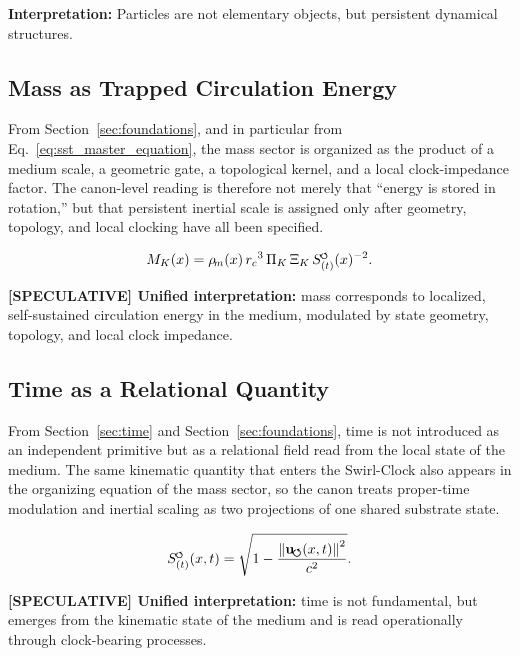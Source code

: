 \documentclass[11pt]{article}
\theoremstyle{definition}
\theoremstyle{plain}
\theoremstyle{remark}
\newcommand{\swirlarrow}{\mathchoice{\mkern-2mu\scriptstyle\boldsymbol{\circlearrowleft}}{\mkern-2mu\scriptstyle\boldsymbol{\circlearrowleft}}{\mkern-2mu\scriptscriptstyle\boldsymbol{\circlearrowleft}}{\mkern-2mu\scriptscriptstyle\boldsymbol{\circlearrowleft}}}
\newcommand{\rhoM}{\rho_{\!m}}
\newcommand{\SwirlClock}{{S_{(t)}^{\swirlarrow}}}
\newcommand{\rc}{{r_c}}
\newcommand{\uswirl}{\mathbf{u}_{\!\boldsymbol{\circlearrowleft}}}
\begin{document}
        \textbf{Interpretation:}
        Particles are not elementary objects, but persistent dynamical structures.
    
    \subsection{Mass as Trapped Circulation Energy}
        
        From Section~\ref{sec:foundations}, and in particular from Eq.~\eqref{eq:sst_master_equation}, the mass sector is organized as the product of a medium scale, a geometric gate, a topological kernel, and a local clock-impedance factor. The canon-level reading is therefore not merely that ``energy is stored in rotation,'' but that persistent inertial scale is assigned only after geometry, topology, and local clocking have all been specified.
        
        \begin{align}
            M_K(x)=\rhoM(x)\,\rc^3\,\Pi_K\,\Xi_K\,\SwirlClock(x)^{-2}.
        \end{align}
        
        \textbf{[SPECULATIVE] Unified interpretation:} mass corresponds to localized, self-sustained circulation energy in the medium, modulated by state geometry, topology, and local clock impedance.
    
    \subsection{Time as a Relational Quantity}
        
        From Section~\ref{sec:time} and Section~\ref{sec:foundations}, time is not introduced as an independent primitive but as a relational field read from the local state of the medium. The same kinematic quantity that enters the Swirl-Clock also appears in the organizing equation of the mass sector, so the canon treats proper-time modulation and inertial scaling as two projections of one shared substrate state.
        
        \begin{align}
            \SwirlClock(x,t)=\sqrt{1-\frac{\norm{\uswirl(x,t)}^2}{c^2}}.
        \end{align}
        
        \textbf{[SPECULATIVE] Unified interpretation:} time is not fundamental, but emerges from the kinematic state of the medium and is read operationally through clock-bearing processes.
    
\end{document}

